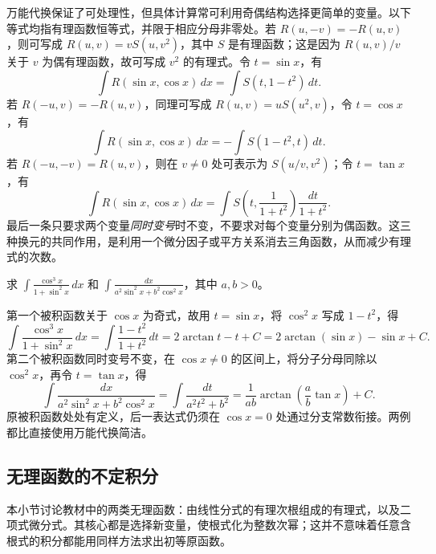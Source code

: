 \documentclass[UTF8,12pt,a4paper,fontset=fandol]{ctexbook}
\begin{document}
万能代换保证了可处理性，但具体计算常可利用奇偶结构选择更简单的变量。以下等式均指有理函数恒等式，并限于相应分母非零处。若 $R(u,-v)=-R(u,v)$，则可写成 $R(u,v)=vS(u,v^2)$，其中 $S$ 是有理函数；这是因为 $R(u,v)/v$ 关于 $v$ 为偶有理函数，故可写成 $v^2$ 的有理式。令 $t=\sin x$，有
\[
    \int R(\sin x,\cos x)\,dx
       =\int S(t,1-t^2)\,dt.
\]
若 $R(-u,v)=-R(u,v)$，同理可写成 $R(u,v)=uS(u^2,v)$，令 $t=\cos x$，有
\[
    \int R(\sin x,\cos x)\,dx
       =-\int S(1-t^2,t)\,dt.
\]
若 $R(-u,-v)=R(u,v)$，则在 $v\neq0$ 处可表示为 $S(u/v,v^2)$；令 $t=\tan x$，有
\[
    \int R(\sin x,\cos x)\,dx
       =\int S\left(t,\frac1{1+t^2}\right)\frac{dt}{1+t^2}.
\]
最后一条只要求两个变量\emph{同时变号}时不变，不要求对每个变量分别为偶函数。这三种换元的共同作用，是利用一个微分因子或平方关系消去三角函数，从而减少有理式的次数。

\begin{example}
\label{ex:parity-substitutions-for-trigonometric-integrals}
求 $\displaystyle\int\frac{\cos^3x}{1+\sin^2x}\,dx$ 和 $\displaystyle\int\frac{dx}{a^2\sin^2x+b^2\cos^2x}$，其中 $a,b>0$。
\end{example}

\begin{solve}
第一个被积函数关于 $\cos x$ 为奇式，故用 $t=\sin x$，将 $\cos^2x$ 写成 $1-t^2$，得
\[
    \int\frac{\cos^3x}{1+\sin^2x}\,dx
      =\int\frac{1-t^2}{1+t^2}\,dt
      =2\arctan t-t+C
      =2\arctan(\sin x)-\sin x+C.
\]
第二个被积函数同时变号不变，在 $\cos x\neq0$ 的区间上，将分子分母同除以 $\cos^2x$，再令 $t=\tan x$，得
\[
    \int\frac{dx}{a^2\sin^2x+b^2\cos^2x}
       =\int\frac{dt}{a^2t^2+b^2}
       =\frac1{ab}\arctan\left(\frac ab\tan x\right)+C.
\]
原被积函数处处有定义，后一表达式仍须在 $\cos x=0$ 处通过分支常数衔接。两例都比直接使用万能代换简洁。
\end{solve}

\subsection{无理函数的不定积分}
\label{subsec:integrals-of-irrational-functions}

本小节讨论教材中的两类无理函数：由线性分式的有理次根组成的有理式，以及二项式微分式。其核心都是选择新变量，使根式化为整数次幂；这并不意味着任意含根式的积分都能用同样方法求出初等原函数。
\end{document}
